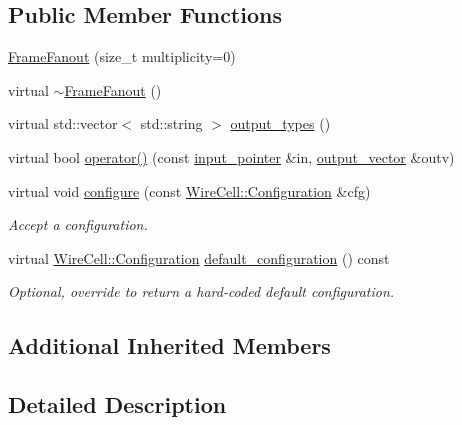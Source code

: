 \subsection*{Public Member Functions}
\begin{DoxyCompactItemize}
\item 
\hyperlink{class_wire_cell_1_1_gen_1_1_frame_fanout_a6a9a605c23de7917a7a84c485be3318c}{Frame\+Fanout} (size\+\_\+t multiplicity=0)
\item 
virtual \hyperlink{class_wire_cell_1_1_gen_1_1_frame_fanout_aa64cb436b00f1878ce0737ae504846f9}{$\sim$\+Frame\+Fanout} ()
\item 
virtual std\+::vector$<$ std\+::string $>$ \hyperlink{class_wire_cell_1_1_gen_1_1_frame_fanout_a71041fd4bf1a0e030e78a7565f7f1671}{output\+\_\+types} ()
\item 
virtual bool \hyperlink{class_wire_cell_1_1_gen_1_1_frame_fanout_ab76cea3280afa9eb3ad4b64f2e12d666}{operator()} (const \hyperlink{class_wire_cell_1_1_i_fanout_node_aefd36d56a531edf1990fe6e263d9c266}{input\+\_\+pointer} \&in, \hyperlink{class_wire_cell_1_1_i_fanout_node_a650cda83709781daac2d67af7c3706df}{output\+\_\+vector} \&outv)
\item 
virtual void \hyperlink{class_wire_cell_1_1_gen_1_1_frame_fanout_a66602d8adef18040786c72aad4d927ec}{configure} (const \hyperlink{namespace_wire_cell_a9f705541fc1d46c608b3d32c182333ee}{Wire\+Cell\+::\+Configuration} \&cfg)
\begin{DoxyCompactList}\small\item\em Accept a configuration. \end{DoxyCompactList}\item 
virtual \hyperlink{namespace_wire_cell_a9f705541fc1d46c608b3d32c182333ee}{Wire\+Cell\+::\+Configuration} \hyperlink{class_wire_cell_1_1_gen_1_1_frame_fanout_a1a88680f563eec18653bddfd71925cdd}{default\+\_\+configuration} () const
\begin{DoxyCompactList}\small\item\em Optional, override to return a hard-\/coded default configuration. \end{DoxyCompactList}\end{DoxyCompactItemize}
\subsection*{Additional Inherited Members}


\subsection{Detailed Description}



